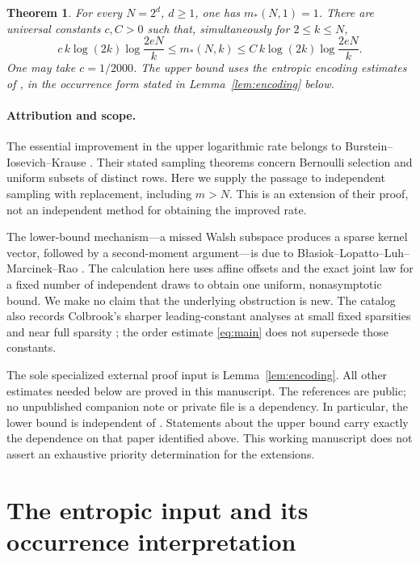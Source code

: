 \documentclass[11pt]{article}
\newtheorem{theorem}{Theorem}[section]
\theoremstyle{remark}
\newcommand{\1}{\mathbf 1}
\begin{document}
\begin{theorem}\label{thm:main}
For every $N=2^d$, $d\geq1$, one has $m_*(N,1)=1$. There are universal
constants $c,C>0$ such that, simultaneously for $2\leq k\leq N$,
\begin{equation}\label{eq:main}
 c\,k\log(2k)\log\frac{2eN}{k}
 \leq m_*(N,k)\leq
 C\,k\log(2k)\log\frac{2eN}{k}.
\end{equation}
One may take $c=1/2000$. The upper bound uses the entropic encoding
estimates of \cite[Sections 2--4]{BIK}, in the occurrence form stated
in Lemma~\ref{lem:encoding} below.
\end{theorem}

\paragraph{Attribution and scope.}
The essential improvement in the upper logarithmic rate belongs to
Burstein--Iosevich--Krause \cite{BIK}. Their stated sampling theorems
concern Bernoulli selection and uniform subsets of distinct rows. Here we
supply the passage to independent sampling with replacement, including
$m>N$. This is an extension of their proof, not an independent method
for obtaining the improved rate.

The lower-bound mechanism---a missed Walsh subspace produces a sparse
kernel vector, followed by a second-moment argument---is due to
B{\l}asiok--Lopatto--Luh--Marcinek--Rao \cite{BLLMR}. The calculation here
uses affine offsets and the exact joint law for a fixed number of
independent draws to obtain one uniform, nonasymptotic bound. We make no
claim that the underlying obstruction is new. The catalog also records
Colbrook's sharper leading-constant analyses at small fixed sparsities
and near full sparsity \cite{FR10}; the order estimate
\eqref{eq:main} does not supersede those constants.

The sole specialized external proof input is Lemma~\ref{lem:encoding}.
All other estimates needed below are proved in this manuscript. The
references are public; no unpublished companion note or private file is
a dependency. In particular, the lower bound is independent of
\cite{BIK}. Statements about the upper bound carry exactly the dependence
on that paper identified above. This working manuscript does not assert
an exhaustive priority determination for the extensions.

\section{The entropic input and its occurrence interpretation}
\end{document}
